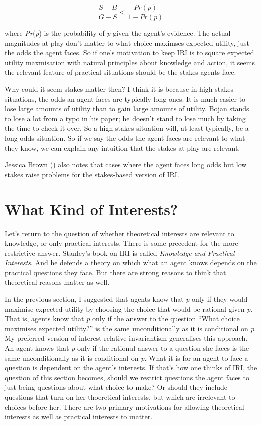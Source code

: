 \documentclass[
  10pt,
  letterpaper,
  DIV=11,
  numbers=noendperiod,
  twoside]{scrartcl}
\begin{document}
\[
\frac{S-B}{G-S} < \frac{Pr(p)}{1-Pr(p)}
\]

where \emph{Pr}(\emph{p}) is the probability of \emph{p} given the
agent's evidence. The actual magnitudes at play don't matter to what
choice maximses expected utility, just the odds the agent faces. So if
one's motivation to keep IRI is to square expected utility maxmisation
with natural principles about knowledge and action, it seems the
relevant feature of practical situations should be the stakes agents
face.

Why could it seem stakes matter then? I think it is because in high
stakes situations, the odds an agent faces are typically long ones. It
is much easier to lose large amounts of utility than to gain large
amounts of utility. Bojan stands to lose a lot from a typo in his paper;
he doesn't stand to lose much by taking the time to check it over. So a
high stakes situation will, at least typically, be a long odds
situation. So if we say the odds the agent faces are relevant to what
they know, we can explain any intuition that the stakes at play are
relevant.

Jessica Brown () also notes that
cases where the agent faces long odds but low stakes raise problems for
the stakes-based version of IRI.

\section{What Kind of Interests?}\label{whatkindofinterests}

Let's return to the question of whether theoretical interests are
relevant to knowledge, or only practical interests. There is some
precedent for the more restrictive answer. Stanley's book on IRI is
called \emph{Knowledge and Practical Interests}. And he defends a theory
on which what an agent knows depends on the practical questions they
face. But there are strong reasons to think that theoretical reasons
matter as well.

In the previous section, I suggested that agents know that \emph{p} only
if they would maximise expected utility by choosing the choice that
would be rational given \emph{p}. That is, agents know that \emph{p}
only if the answer to the question ``What choice maximises expected
utility?'' is the same unconditionally as it is conditional on \emph{p}.
My preferred version of interest-relative invariantism generalises this
approach. An agent knows that \emph{p} only if the rational answer to a
question she faces is the same unconditionally as it is conditional on
\emph{p}. What it is for an agent to face a question is dependent on the
agent's interests. If that's how one thinks of IRI, the question of this
section becomes, should we restrict questions the agent faces to just
being questions about what choice to make? Or should they include
questions that turn on her thoeretical interests, but which are
irrelevant to choices before her. There are two primary motivations for
allowing theoretical interests as well as practical interests to matter.
\end{document}
